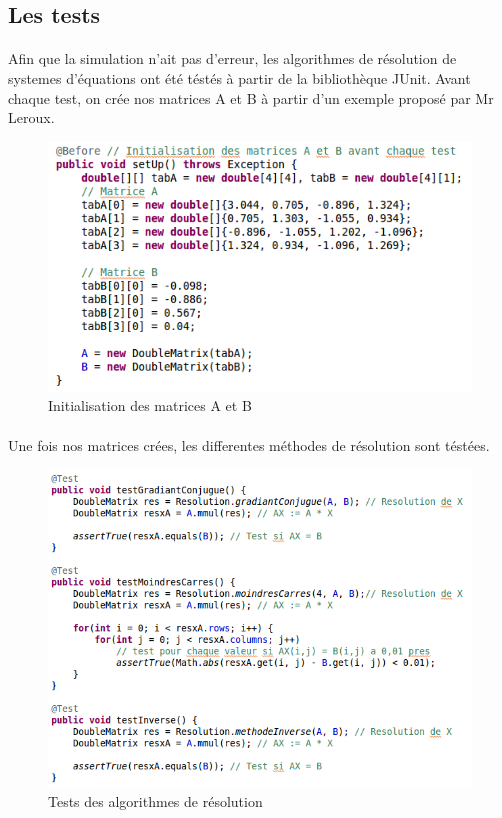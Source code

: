 \documentclass[a4paper,11pt]{article}
\begin{document}
		\subsection{Les tests}
		\paragraph{}
		Afin que la simulation n'ait pas d'erreur, les algorithmes de résolution de systemes d'équations ont été téstés à partir de la bibliothèque JUnit.
		Avant chaque test, on crée nos matrices A et B à partir d'un exemple proposé par Mr Leroux.

		\begin{figure}[h]
			\centerline{\includegraphics[scale=0.50]{img/testInit.png}}
			\caption{Initialisation des matrices A et B}
			\label{diagramme-composants}
		\end{figure} 

		\paragraph{}
		Une fois nos matrices crées, les differentes méthodes de résolution sont téstées.

		\begin{figure}[h]
			\centerline{\includegraphics[scale=0.50]{img/testResol.png}}
			\caption{Tests des algorithmes de résolution}
			\label{diagramme-composants}
		\end{figure} 
\end{document}
